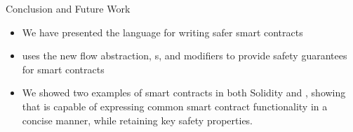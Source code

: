 \documentclass[leqno,presentation,usenames,dvipsnames]{beamer}
\begin{document}
\begin{frame}{Conclusion and Future Work}
    \begin{itemize}
        \item We have presented the \langName language for writing safer smart contracts
        \item \langName uses the new flow abstraction, \assetTxt{}s, and modifiers to provide safety guarantees for smart contracts
        \item We showed two examples of smart contracts in both Solidity and \langName, showing that \langName is capable of expressing common smart contract functionality in a concise manner, while retaining key safety properties.
    \end{itemize}
\end{frame}
\end{document}

